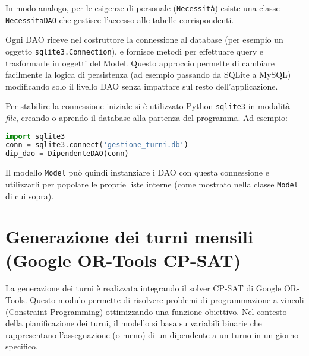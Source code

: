 \documentclass[a4paper,12pt]{report}
\begin{document}
In modo analogo, per le esigenze di personale (\texttt{Necessit\`a}) esiste una classe \texttt{NecessitaDAO} che gestisce l'accesso alle tabelle corrispondenti.

Ogni DAO riceve nel costruttore la connessione al database (per esempio un oggetto \texttt{sqlite3.Connection}), e fornisce metodi per effettuare query e trasformarle in oggetti del Model. Questo approccio permette di cambiare facilmente la logica di persistenza (ad esempio passando da SQLite a MySQL) modificando solo il livello DAO senza impattare sul resto dell'applicazione.

Per stabilire la connessione iniziale si \`e utilizzato Python \texttt{sqlite3} in modalit\`a \emph{file}, creando o aprendo il database alla partenza del programma. Ad esempio:
\begin{lstlisting}[language=Python]
import sqlite3
conn = sqlite3.connect('gestione_turni.db')
dip_dao = DipendenteDAO(conn)
\end{lstlisting}
Il modello \texttt{Model} pu\`o quindi instanziare i DAO con questa connessione e utilizzarli per popolare le proprie liste interne (come mostrato nella classe \texttt{Model} di cui sopra).

\chapter{Generazione dei turni mensili (Google OR-Tools CP-SAT)}
\label{cap:turni}
La generazione dei turni \`e realizzata integrando il solver CP-SAT di Google OR-Tools. Questo modulo permette di risolvere problemi di programmazione a vincoli (Constraint Programming) ottimizzando una funzione obiettivo. Nel contesto della pianificazione dei turni, il modello si basa su variabili binarie che rappresentano l'assegnazione (o meno) di un dipendente a un turno in un giorno specifico.
\end{document}
